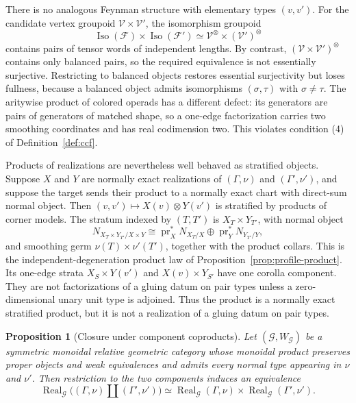 \documentclass[11pt,letterpaper,twoside]{article}
\theoremstyle{plain}
\newtheorem{proposition}[theorem]{Proposition}
\theoremstyle{definition}
\theoremstyle{remark}
\newcommand{\Real}{\operatorname{Real}}
\begin{document}
There is no analogous Feynman structure with elementary types \((v,v')\).  For the candidate vertex groupoid \(\mathcal V\times\mathcal V'\), the isomorphism groupoid
\[
 \operatorname{Iso}(\mathcal F)\times\operatorname{Iso}(\mathcal F')
 \simeq \mathcal V^{\otimes}\times(\mathcal V')^{\otimes}
\]
contains pairs of tensor words of independent lengths.  By contrast, \((\mathcal V\times\mathcal V')^{\otimes}\) contains only balanced pairs, so the required equivalence is not essentially surjective.  Restricting to balanced objects restores essential surjectivity but loses fullness, because a balanced object admits isomorphisms \((\sigma,\tau)\) with \(\sigma\neq\tau\).  The aritywise product of colored operads has a different defect: its generators are pairs of generators of matched shape, so a one-edge factorization carries two smoothing coordinates and has real codimension two.  This violates condition (4) of Definition~\ref{def:ccf}.

Products of realizations are nevertheless well behaved as stratified objects.  Suppose \(X\) and \(Y\) are normally exact realizations of \((\Gamma,\nu)\) and \((\Gamma',\nu')\), and suppose the target sends their product to a normally exact chart with direct-sum normal object.  Then \((v,v')\mapsto X(v)\otimes Y(v')\) is stratified by products of corner models.  The stratum indexed by \((T,T')\) is \(X_T\times Y_{T'}\), with normal object
\begin{equation}\label{eq:external-product-normal}
 N_{X_T\times Y_{T'}/X\times Y}
 \cong
 \operatorname{pr}_X^*N_{X_T/X}
 \oplus
 \operatorname{pr}_Y^*N_{Y_{T'}/Y},
\end{equation}
and smoothing germ \(\nu(T)\times\nu'(T')\), together with the product collars.  This is the independent-degeneration product law of Proposition~\ref{prop:profile-product}.  Its one-edge strata \(X_S\times Y(v')\) and \(X(v)\times Y_{S'}\) have one corolla component.  They are not factorizations of a gluing datum on pair types unless a zero-dimensional unary unit type is adjoined.  Thus the product is a normally exact stratified product, but it is not a realization of a gluing datum on pair types.

\begin{proposition}[Closure under component coproducts]\label{prop:realization-closure}
Let \((\mathcal G,W_{\mathcal G})\) be a symmetric monoidal relative geometric category whose monoidal product preserves proper objects and weak equivalences and admits every normal type appearing in \(\nu\) and \(\nu'\).  Then restriction to the two components induces an equivalence
\begin{equation}\label{eq:coproduct-realization}
 \Real_{\mathcal G}
 \bigl((\Gamma,\nu)\amalg(\Gamma',\nu')\bigr)
 \simeq
 \Real_{\mathcal G}(\Gamma,\nu)
 \times
 \Real_{\mathcal G}(\Gamma',\nu').
\end{equation}
\end{proposition}
\end{document}
